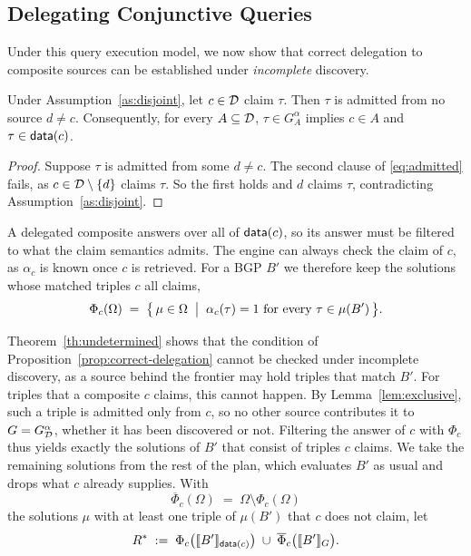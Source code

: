 \subsection{Delegating Conjunctive Queries}
Under this query execution model, we now show that correct delegation to composite
sources can be established under \emph{incomplete} discovery.

\begin{lemma}
\label{lem:exclusive}
Under Assumption~\ref{as:disjoint}, let $c \in \mathcal{D}$ claim $\tau$. Then $\tau$ is
admitted from no source $d \neq c$. Consequently, for every $A \subseteq \mathcal{D}$,
$\tau \in G^{\alpha}_A$ implies $c \in A$ and $\tau \in \mathsf{data}(c)$.
\end{lemma}

\begin{proof}
Suppose $\tau$ is admitted from some $d \neq c$. The second clause of
\eqref{eq:admitted} fails, as $c \in \mathcal{D} \setminus \{d\}$ claims $\tau$. So the first
holds and $d$ claims $\tau$, contradicting Assumption~\ref{as:disjoint}.
\end{proof}

A delegated composite answers over all of $\mathsf{data}(c)$, so its answer must be filtered
to what the claim semantics admits. The engine can always check the claim of $c$, as
$\alpha_c$ is known once $c$ is retrieved. For a BGP $B'$ we therefore keep the solutions
whose matched triples $c$ all claims,
\[
  \Phi_c(\Omega) \;=\; \bigl\{\, \mu \in \Omega \;\bigm|\; \alpha_c(\tau) = 1
  \text{ for every } \tau \in \mu(B') \,\bigr\}.
\]

Theorem~\ref{th:undetermined} shows that the condition of
Proposition~\ref{prop:correct-delegation} cannot be checked under incomplete discovery, as a
source behind the frontier may hold triples that match $B'$. For triples that a
composite $c$ claims, this cannot happen. By Lemma~\ref{lem:exclusive}, such a triple is
admitted only from $c$, so no other source contributes it to $G = G^{\alpha}_{\mathcal{D}}$,
whether it has been discovered or not. Filtering the answer of $c$ with $\Phi_c$ thus
yields exactly the solutions of $B'$ that consist of triples $c$ claims. We take the
remaining solutions from the rest of the plan, which evaluates $B'$ as usual and drops
what $c$ already supplies. With
\[
  \overline{\Phi}_c(\Omega) \;=\; \Omega \setminus \Phi_c(\Omega)
\]
the solutions $\mu$ with at least one triple of $\mu(B')$ that $c$ does not claim, let
\[
  R^{*} \;:=\; \Phi_c\bigl(\llbracket B' \rrbracket_{\mathsf{data}(c)}\bigr) \;\cup\;
  \overline{\Phi}_c\bigl(\llbracket B' \rrbracket_{G}\bigr).
\]

